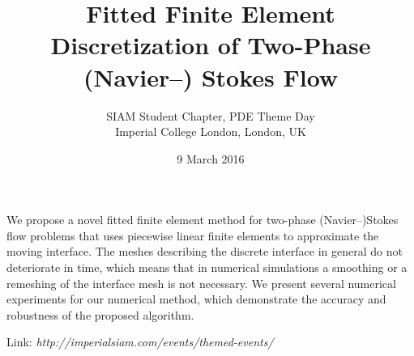 \documentclass{article}
\begin{document}
\title{Fitted Finite Element Discretization of Two-Phase (Navier--) Stokes
Flow}
\date{9 March 2016}
\author{SIAM Student Chapter, PDE Theme Day\\
Imperial College London, London, UK}

\maketitle

We propose a novel fitted finite element method for two-phase (Navier--)Stokes
flow problems that uses piecewise linear finite elements to approximate the
moving interface. The meshes describing the discrete interface in general do not
deteriorate in time, which means that in numerical simulations a smoothing or a
remeshing of the interface mesh is not necessary. We present several numerical
experiments for our numerical method, which demonstrate the accuracy and
robustness of the proposed algorithm.
\newline

Link: \emph{http://imperialsiam.com/events/themed-events/}
\end{document}
